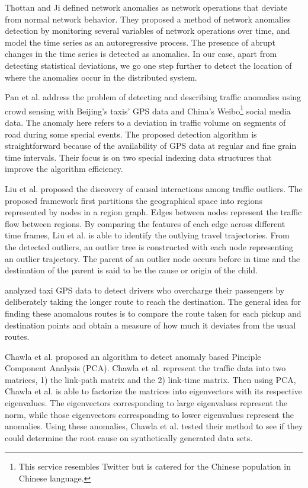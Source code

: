 \documentclass[conference]{IEEEtran.1.8}
\begin{document}
Thottan and Ji \cite{Thottan2003} defined network anomalies as network operations that deviate from normal network behavior. They proposed a method of network anomalies detection by monitoring several variables of network operations over time, and model the time series as an autoregressive process. The presence of abrupt changes in the time series is detected as anomalies. In our case, apart from detecting statistical deviations, we go one step further to detect the location of where the anomalies occur in the distributed system.

Pan et al. \cite{Pan2013} address the problem of detecting and describing traffic anomalies using crowd sensing with Beijing's taxis' GPS data and China's Weibo\footnote{This service resembles Twitter but is catered for the Chinese population in Chinese language.} social media data. The anomaly here refers to a deviation in traffic volume on segments of road during some special events. The proposed detection algorithm is straightforward because of the availability of GPS data at regular and fine grain time intervals. Their focus is on two special indexing data structures that improve the algorithm efficiency.

Liu et al. \cite{Liu2011} proposed the discovery of causal interactions among traffic outliers. The proposed framework first partitions the geographical space into regions represented by nodes in a region graph. Edges between nodes represent the traffic flow between regions. By comparing the features of each edge across different time frames, Liu et al. is able to identify the outlying travel trajectories. From the detected outliers, an outlier tree is constructed with each node representing an outlier trajectory. The parent of an outlier node occurs before in time and the destination of the parent is said to be the cause or origin of the child.

\cite{Ge2011,Zhang2011,Zhang2012} analyzed taxi GPS data to detect drivers who overcharge their passengers by deliberately taking the longer route to reach the destination. The general idea for finding these anomalous routes is to compare the route taken for each pickup and destination points and obtain a measure of how much it deviates from the usual routes.

Chawla et al. \cite{Chawla2012} proposed an algorithm to detect anomaly based Pinciple Component Analysis (PCA). Chawla et al. \cite{Chawla2012} represent the traffic data into two matrices, 1) the link-path matrix and the 2) link-time matrix. Then using PCA, Chawla et al. \cite{Chawla2012} is able to factorize the matrices into eigenvectors with its respective eigenvalues. The eigenvectors corresponding to large eigenvalues represent the norm, while those eigenvectors corresponding to lower eigenvalues represent the anomalies. Using these anomalies, Chawla et al. \cite{Chawla2012} tested their method to see if they could determine the root cause on synthetically generated data sets.
\end{document}

